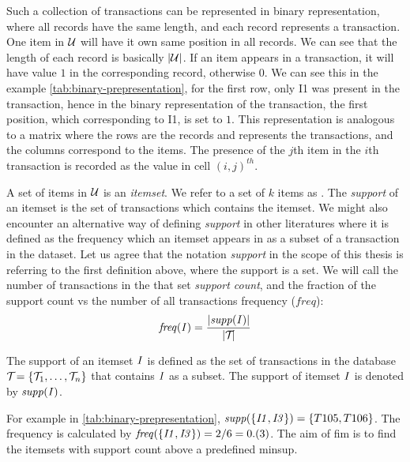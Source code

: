 Such a collection of transactions can be represented in binary representation, where all records have the same length, and each record represents a transaction.
One item in $\mathcal{U}$ will have it own same position in all records.
We can see that the length of each record is basically $|\mathcal{U}|$.
If an item appears in a transaction, it will have value $1$ in the corresponding record, otherwise $0$.
We can see this in the example \autoref{tab:binary-prepresentation}, for the first row, only I1 was present in the transaction, hence in the binary representation of the transaction, the first position, which corresponding to I1, is set to $1$.
This representation is analogous to a matrix where the rows are the records and represents the transactions, and the columns correspond to the items.
The presence of the $\mathit{j}$th item in the $\mathit{i}$th transaction is recorded as the value in cell $\mathit{(i, j)}^{th}$.

A set of items in $\mathcal{U}$ is an \textit{itemset}.
We refer to a set of $k$ items as \kItemset.
The \textit{support} of an itemset is the set of transactions which contains the itemset.
We might also encounter an alternative way of defining \textit{support} in other literatures where it is defined as the frequency which an itemset appears in as a subset of a transaction in the dataset.
Let us agree that the notation \textit{support} in the scope of this thesis is referring to the first definition above, where the support is a set.
We will call the number of transactions in the that set \textit{support count}, and the fraction of the support count vs the number of all transactions frequency ($\mathit{freq}$): 
\begin{equation}
    \mathit{freq({I})} = \frac{\lvert\mathit{supp({I})}\rvert}{\lvert\mathcal{T}_{}\rvert}
\end{equation}

\begin{definition}[Support]
    The support of an itemset $\mathit{I}$ is defined as the set of transactions in the database $\mathcal{T}_{} = \{\mathcal{T}_{1}, \dots, \mathcal{T}_{n}\}{}$ that contains $\mathit{I}$ as a subset.
    The support of itemset $\mathit{I}$ is denoted by $\mathit{supp({I})}$.
\end{definition}
For example in \autoref{tab:binary-prepresentation}, $\mathit{supp({\{I1, I3\}})} = \{T105, T106\}$.
The frequency is calculated by $\mathit{freq({\{I1, I3\}})}=2/6=0.(3)$.
The aim of \acl{fim} is to find the itemsets with support count above a predefined \ac{minsup}.

